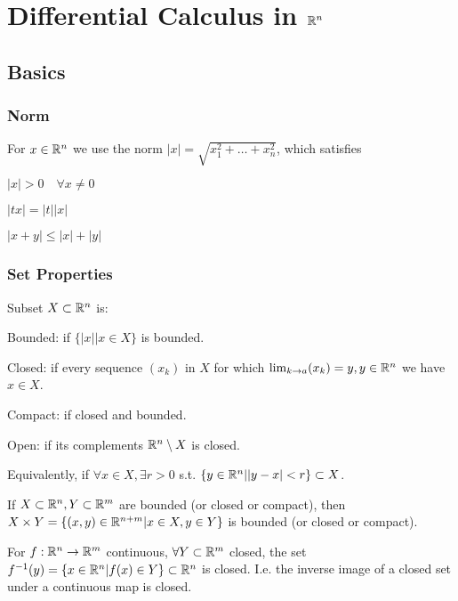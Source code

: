 
\section{Differential Calculus in $\mathbb{R}^n$}

\subsection{Basics}
\subsubsection{Norm}
For $x \in \mathbb{R}^n$ we use the norm $\left| x \right | = \sqrt{x_1^2 + \dots + x_n^2}$, which satisfies

\begin{inparaitem}
    \item $| x | > 0 \quad \forall x \neq 0$
    \item $| tx | = | t | | x |$
    \item $| x + y | \le | x | + | y |$
\end{inparaitem}

\subsubsection{Set Properties}
Subset $X \subset \mathbb{R}^n$ is:
\begin{compactdesc}
    \item[Bounded:] if $\{|x| | x \in X\}$ is bounded.
    \item[Closed:] if every sequence $(x_k)$ in $X$ for which $\lim_{k \to a} (x_k) = y, y \in \mathbb{R}^n$ we have $x \in X$.
    \item[Compact:] if closed and bounded.
    \item[Open:] if its complements $\mathbb{R}^n \setminus X$ is closed.
        \begin{compactitem}
            \item Equivalently, if $\forall x \in X, \exists r > 0$ s.t. $\{y \in \mathbb{R}^n | |y - x| < r\} \subset X$.
        \end{compactitem}
\end{compactdesc}

\begin{compactitem}
    \item If $X \subset \mathbb{R}^n, Y \subset \mathbb{R}^m$ are bounded (or closed or compact), then $X \times Y = \{(x, y) \in \mathbb{R}^{n+m} | x \in X, y \in Y\}$ is bounded (or closed or compact).
    \item For $f: \mathbb{R}^n \to \mathbb{R}^m$ continuous, $\forall Y \subset \mathbb{R}^m$ closed, the set $f^{-1}(y) = \{x \in \mathbb{R}^n | f(x) \in Y\} \subset \mathbb{R}^n$ is closed. I.e. the inverse image of a closed set under a continuous map is closed.
\end{compactitem}

